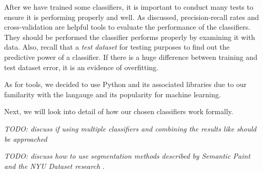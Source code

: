 After we have trained some classifiers, it is important to conduct many tests to ensure it is performing properly and well. As discussed, precision-recall rates and cross-validation are helpful tools to evaluate the performance of the classifiers. They should be performed the classifier performs properly by examining it with data. Also, recall that a \textit{test dataset} for testing purposes to find out the predictive power of a classifier. If there is a huge difference between training and test dataset error, it is an evidence of overfitting.


As for tools, we decided to use Python and its associated libraries due to our familarity with the langauge and its popularity for machine learning.

Next, we will look into detail of how our chosen classifiers work formally.

\textit{TODO: discuss if using multiple classifiers and combining the results like \cite{forestry} should be approached}

\textit{TODO: discuss how to use segmentation methods described by Semantic Paint \cite{semantic-paint} and the NYU Dataset research \cite{nyu-dataset}}.
